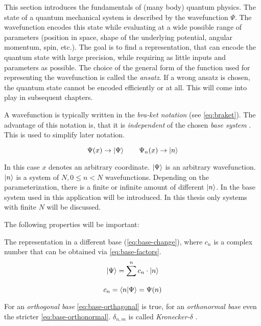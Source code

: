 This section introduces the fundamentals of (many body) quantum physics.
The state of a quantum mechanical system is described by the wavefunction $\Psi$. 
The wavefunction encodes this state while evaluating at a wide possible range of parameters (position in space, shape of the underlying potential, angular momentum, spin, etc.).
The goal is to find a representation, that can encode the quantum state with large precision, while requiring as little inputs and parameters as possible. The choice of the general form of the function used for representing the wavefunction is called the \emph{ansatz}. 
If a wrong ansatz is chosen, the quantum state cannot be encoded efficiently or at all. This will come into play in subsequent chapters.

A wavefunction is typically written in the \emph{bra-ket notation} (see \autoref{eq:braket}). The advantage of this notation is, that it is \emph{independent} of the chosen \emph{base system} \cite[]{schwablQM}. This is used to simplify later notation.  

\begin{equation}
    \label{eq:braket}
    \Psi(x) \rightarrow \ket{\Psi} \qquad \Psi_n(x) \rightarrow \ket{n}
\end{equation}

In this case $x$ denotes an arbitrary coordinate. $\ket{\Psi}$ is an arbitrary wavefunction. $\ket{n}$ is a system of $N, 0\leq n< N$ wavefunctions. Depending on the parameterization, there is a finite or infinite amount of different $\ket{n}$. In  the base system used in this application will be introduced. In this thesis only systems with finite $N$ will be discussed.

The following properties will be important:

The representation in a different base (\autoref{eq:base-change}), where $c_n$ is a complex number that can be obtained via \autoref{eq:base-factors}.
\begin{equation}
    \label{eq:base-change}
    \ket{\Psi} = \sum\limits_{}^{n} c_n \cdot \ket{n}
\end{equation}
\begin{equation}
    \label{eq:base-factors}
    c_n = \bra{n}\ket{\Psi} = \Psi(n)
\end{equation}

For an \emph{orthogonal base} \autoref{eq:base-orthagonal} is true, for an \emph{orthonormal base} even the stricter \autoref{eq:base-orthonormal}. $\delta_{n, m}$ is called \emph{Kronecker-$\delta$} \cite{schwablQM}.

